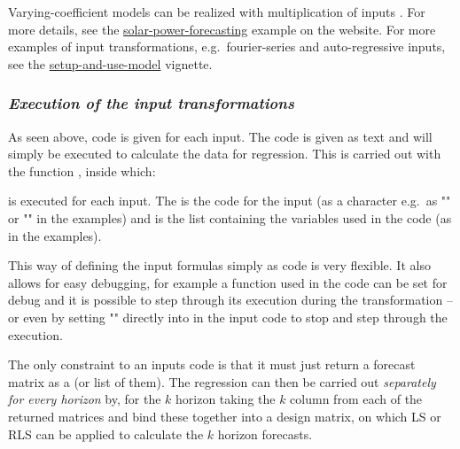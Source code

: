 Varying-coefficient models can be realized with multiplication of inputs
\citep{hastie1993varying}. For more details, see the
\href{https://onlineforecasting.org/examples/solar-power-forecasting.html}{solar-power-forecasting}
example on the website. For more examples of input transformations, e.g.\ fourier-series and
auto-regressive inputs, see the
\href{https://onlineforecasting.org/vignettes/setup-and-use-model.html#input-transformations}{setup-and-use-model} vignette.


\subsubsection{\it Execution of the input transformations}

As seen above, \Rprog code is given for each
input. The code is given as text and will simply be executed to calculate the
data for regression. This is carried out with the function
, inside which:
\begin{knitrout}
\color{fgcolor}\begin{kframe}
\begin{alltt}
\hlstd{(}\hlstd{(}
\end{alltt}
\end{kframe}
\end{knitrout}
is executed for each input. The  is
the \Rprog code for the input (as a character e.g.\ as "" or
"" in the examples)
and  is the list containing the variables used in the
 code (as  in the examples).

This way of defining the input formulas simply as code is very flexible. It also
allows for easy debugging, for example a function used in the code can
be set for debug and it is possible to step through its execution during the transformation
-- or even by setting "" directly into in the input code to stop and step through the execution.

The only constraint to an inputs code is that it must just return a forecast
matrix as a  (or list of them). The regression can
then be carried out \emph{separately for every horizon} by, for the $k$ horizon
taking the $k$
column from each of the returned matrices and bind these together into a
design matrix, on which LS or RLS can be applied to calculate the $k$ horizon forecasts.


